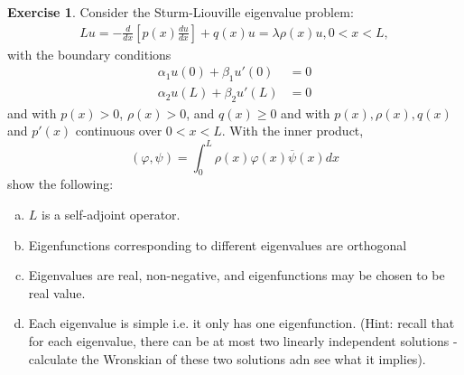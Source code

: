 \documentclass[12pt]{article}
\renewcommand{\phi}{\varphi}
\theoremstyle{definition}
\newtheorem{exer}{Exercise}
\theoremstyle{remark}
\begin{document}
\begin{exer}
Consider the Sturm-Liouville eigenvalue problem:
\begin{align*}
    Lu = -\frac{d}{dx}\left[ p(x) \frac{du}{dx} \right] + q(x) u = \lambda \rho(x) u, 0 < x < L,
\end{align*}
with the boundary conditions
\begin{align*}
    \alpha_{1}u(0) + \beta_{1}u'(0) &= 0\\
    \alpha_{2}u(L) + \beta_{2}u'(L) &= 0
\end{align*}
and with $p(x) > 0$,  $\rho(x) > 0$, and  $q(x) \geq 0$ and with  $p(x), \rho(x), q(x)$ and  $p'(x)$ continuous over  $0 < x < L$. With the inner product,
\begin{equation*}
    (\phi, \psi) = \int_{0}^{L} \rho(x) \phi(x) \overline{\psi}(x)dx
\end{equation*}
show the following:

\begin{enumerate}[(a)]
    \item $L$ is a self-adjoint operator.
    \item Eigenfunctions corresponding to different eigenvalues are orthogonal 
    \item Eigenvalues are real, non-negative, and eigenfunctions may be chosen to be real value.
    \item Each eigenvalue is simple i.e. it only has one eigenfunction. (Hint: recall that for each eigenvalue, there can be at most two linearly independent solutions - calculate the Wronskian of these two solutions adn see what it implies).
\end{enumerate}
\end{exer}
\end{document}
